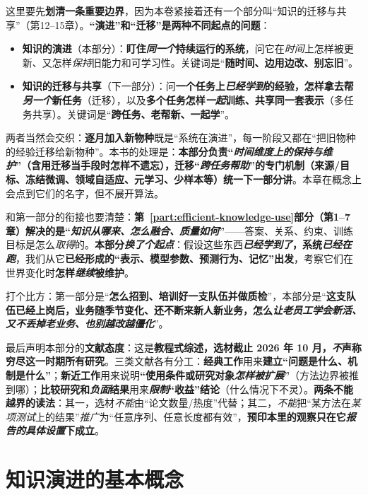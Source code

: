 这里要先\textbf{划清一条重要边界}，因为本卷紧接着还有一个部分叫“知识的迁移与共享”（第12–15章）。\textbf{“演进”和“迁移”是两种不同起点的问题}：
\begin{itemize}\item \textbf{知识的演进}（本部分）：\textbf{盯住\emph{同一个}持续运行的系统}，问它在\emph{时间}上怎样被更新、又怎样\emph{保持}旧能力和可学习性。关键词是“\textbf{随时间、边用边改、别忘旧}”。\item \textbf{知识的迁移与共享}（下一部分）：问\textbf{一个任务上\emph{已经学到}的经验，怎样拿去帮\emph{另一个}新任务}（迁移），以及\textbf{多个任务怎样\emph{一起}训练、共享同一套表示}（多任务共享）。关键词是“\textbf{跨任务、老帮新、一起学}”。\end{itemize}
两者当然会交织：\textbf{逐月加入新物种}既是“系统在演进”，每一阶段又都在“把旧物种的经验迁移给新物种”。本书的处理是：\textbf{本部分负责“\emph{时间维度上的保持与维护}”（含用迁移当手段时怎样不遗忘），迁移“\emph{跨任务帮助}”的专门机制（来源/目标、冻结微调、领域自适应、元学习、少样本等）统一下一部分讲}。本章在概念上会点到它们的名字，但不展开算法。

和第一部分的衔接也要清楚：\textbf{第~\ref{part:efficient-knowledge-use}部分（第1–7章）解决的是“\emph{知识从哪来、怎么融合、质量如何}”}——答案、关系、约束、训练目标是怎么\emph{取得}的。\textbf{本部分\emph{换了个起点}}：假设这些东西\textbf{\emph{已经学到了}，系统\emph{已经在跑}}，我们从它\textbf{已经形成的“表示、模型参数、预测行为、记忆”出发}，考察它们在世界变化时\textbf{怎样\emph{继续}被维护}。

打个比方：第一部分是“\textbf{怎么招到、培训好一支队伍并做质检}”，本部分是“\textbf{这支队伍已经上岗后，业务随季节变化、还不断来新人新业务，怎么\emph{让老员工学会新活、又不丢掉老业务、也别越改越僵化}}”。

最后声明本部分的\textbf{文献态度}：这是\textbf{教程式综述，选材截止 2026 年 10 月，\emph{不}声称穷尽这一时期所有研究}。三类文献各有分工：\textbf{经典工作}用来\textbf{建立“问题是什么、机制是什么”}；\textbf{新近工作}用来说明\textbf{“使用条件或研究对象\emph{怎样被扩展}”}（方法边界被推到哪）；\textbf{比较研究和\emph{负面}结果}用来\textbf{\emph{限制}“收益”结论}（什么情况下不灵）。\textbf{两条不能越界的读法}：其一，选材\emph{不能}由“论文数量/热度”代替；其二，\emph{不能}把“某方法在\emph{某项测试}上的结果”\emph{推广}为“任意序列、任意长度都有效”，\textbf{预印本里的观察只在它\emph{报告的具体设置}下成立}。

\section{知识演进的基本概念}
\label{sec:ket-overview-scenarios}
\label{sec:ket-overview-concepts}

